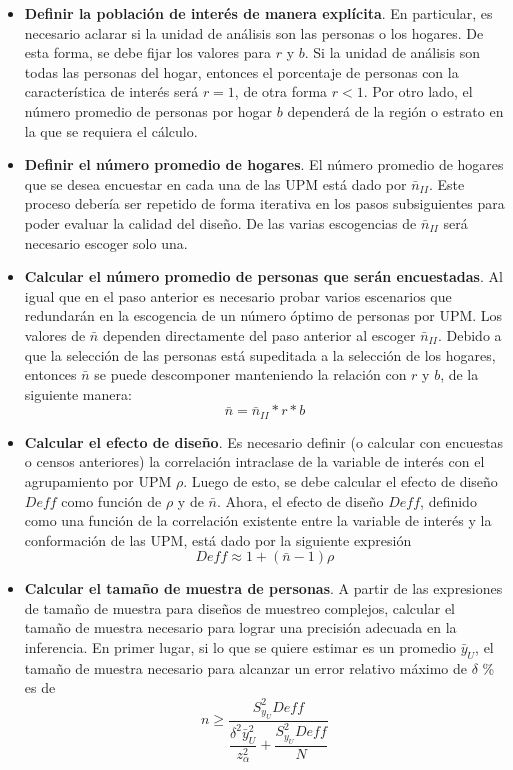 \documentclass[
  10pt,
  spanish,
]{book}
\begin{document}
\begin{itemize}
\item
  \textbf{Definir la población de interés de manera explícita}. En particular, es necesario aclarar si la unidad de análisis son las personas o los hogares. De esta forma, se debe fijar los valores para \(r\) y \(b\). Si la unidad de análisis son todas las personas del hogar, entonces el porcentaje de personas con la característica de interés será \(r = 1\), de otra forma \(r<1\). Por otro lado, el número promedio de personas por hogar \(b\) dependerá de la región o estrato en la que se requiera el cálculo.
\item
  \textbf{Definir el número promedio de hogares}. El número promedio de hogares que se desea encuestar en cada una de las UPM está dado por \(\bar{n}_{II}\). Este proceso debería ser repetido de forma iterativa en los pasos subsiguientes para poder evaluar la calidad del diseño. De las varias escogencias de \(\bar{n}_{II}\) será necesario escoger solo una.
\item
  \textbf{Calcular el número promedio de personas que serán encuestadas}. Al igual que en el paso anterior es necesario probar varios escenarios que redundarán en la escogencia de un número óptimo de personas por UPM. Los valores de \(\bar{n}\) dependen directamente del paso anterior al escoger \(\bar{n}_{II}\). Debido a que la selección de las personas está supeditada a la selección de los hogares, entonces \(\bar{n}\) se puede descomponer manteniendo la relación con \(r\) y \(b\), de la siguiente manera:
  \[
  \bar{n} = \bar{n}_{II} * r * b
  \]
\item
  \textbf{Calcular el efecto de diseño}. Es necesario definir (o calcular con encuestas o censos anteriores) la correlación intraclase de la variable de interés con el agrupamiento por UPM \(\rho\). Luego de esto, se debe calcular el efecto de diseño \(Deff\) como función de \(\rho\) y de \(\bar{n}\). Ahora, el efecto de diseño \(Deff\), definido como una función de la correlación existente entre la variable de interés y la conformación de las UPM, está dado por la siguiente expresión
  \[
  Deff \approx 1 + (\bar{n} - 1)\rho
  \]
\item
  \textbf{Calcular el tamaño de muestra de personas}. A partir de las expresiones de tamaño de muestra para diseños de muestreo complejos, calcular el tamaño de muestra necesario para lograr una precisión adecuada en la inferencia. En primer lugar, si lo que se quiere estimar es un promedio \(\bar{y}_U\), el tamaño de muestra necesario para alcanzar un error relativo máximo de \(\delta\) \% es de
  \[
  n \geq \dfrac{S^2_{y_U}Deff}{\dfrac{\delta^2 \bar{y}_U^2}{z_{\alpha}^2}+\dfrac{S^2_{y_U}Deff}{N}}
  \]
\end{itemize}
\end{document}
